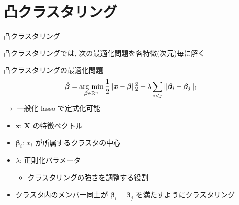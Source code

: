 \documentclass[dvipdfmx, 10pt]{beamer}
\newcommand{\argmin}{\mathop{\rm arg~min}\limits}
\newcommand{\zl}{\rightarrow}
\begin{document}

\section{凸クラスタリング}


\begin{frame}{凸クラスタリング}

    凸クラスタリングでは, 次の最適化問題を各特徴(次元)毎に解く
    \begin{block}{凸クラスタリングの最適化問題}
        \[
            \hat{\bm{\beta}} = \argmin_{\bm{\beta} \in \mathbb{R}^{n}} \frac{1}{2} \|\bm{x} - \bm{\beta} \|_2^2 + \lambda \sum_{i<j} \|\bm{\beta}_{i} - \bm{\beta}_{j}\|_1
        \]
        $\zl$ 一般化 lasso で定式化可能
        \begin{itemize}
            \item $\bm{x}$: $\bm{X}$ の特徴ベクトル
            \item $\bm{\beta}_i$: $x_i$ が所属するクラスタの中心
            \item $\lambda$: 正則化パラメータ
            \begin{itemize}
                \item クラスタリングの強さを調整する役割
            \end{itemize}
        \end{itemize}
    \end{block}
    \begin{itemize}
        \item クラスタ内のメンバー同士が $\bm{\beta}_i = \bm{\beta}_j$ を満たすようにクラスタリング
    \end{itemize}
    
\end{frame}

\end{document}
